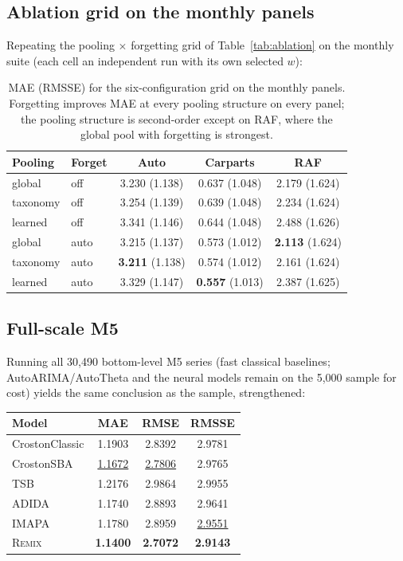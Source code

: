 \documentclass[twocolumn,10pt]{article}
\newcommand{\REMIX}{\textsc{Remix}}
\newcommand{\best}[1]{\textbf{#1}}
\newcommand{\secondbest}[1]{\underline{#1}}
\begin{document}
\subsection{Ablation grid on the monthly panels}
Repeating the pooling $\times$ forgetting grid of
Table~\ref{tab:ablation} on the monthly suite (each cell an independent
run with its own selected $w$):

\begin{table}[h]
\centering
\caption{MAE (RMSSE) for the six-configuration grid on the monthly
panels. Forgetting improves MAE at every pooling structure on every
panel; the pooling structure is second-order except on RAF, where the
global pool with forgetting is strongest.}
\small
\setlength{\tabcolsep}{3.5pt}
\begin{tabular}{llccc}
\toprule
Pooling & Forget & Auto & Carparts & RAF\\
\midrule
global & off & 3.230 (1.138) & 0.637 (1.048) & 2.179 (1.624)\\
taxonomy & off & 3.254 (1.139) & 0.639 (1.048) & 2.234 (1.624)\\
learned & off & 3.341 (1.146) & 0.644 (1.048) & 2.488 (1.626)\\
global & auto & 3.215 (1.137) & 0.573 (1.012) & \textbf{2.113} (1.624)\\
taxonomy & auto & \textbf{3.211} (1.138) & 0.574 (1.012) & 2.161 (1.624)\\
learned & auto & 3.329 (1.147) & \textbf{0.557} (1.013) & 2.387 (1.625)\\
\bottomrule
\end{tabular}
\end{table}

\subsection{Full-scale M5}
Running all 30{,}490 bottom-level M5 series (fast classical baselines;
AutoARIMA/AutoTheta and the neural models remain on the 5{,}000 sample
for cost) yields the same conclusion as the sample, strengthened:

\begin{table}[h]
\centering
\small
\begin{tabular}{lccc}
\toprule
Model & MAE & RMSE & RMSSE\\
\midrule
CrostonClassic & 1.1903 & 2.8392 & 2.9781\\
CrostonSBA & \secondbest{1.1672} & \secondbest{2.7806} & 2.9765\\
TSB & 1.2176 & 2.9864 & 2.9955\\
ADIDA & 1.1740 & 2.8893 & 2.9641\\
IMAPA & 1.1780 & 2.8959 & \secondbest{2.9551}\\
\REMIX{} & \best{1.1400} & \best{2.7072} & \best{2.9143}\\
\bottomrule
\end{tabular}
\end{table}
\end{document}
